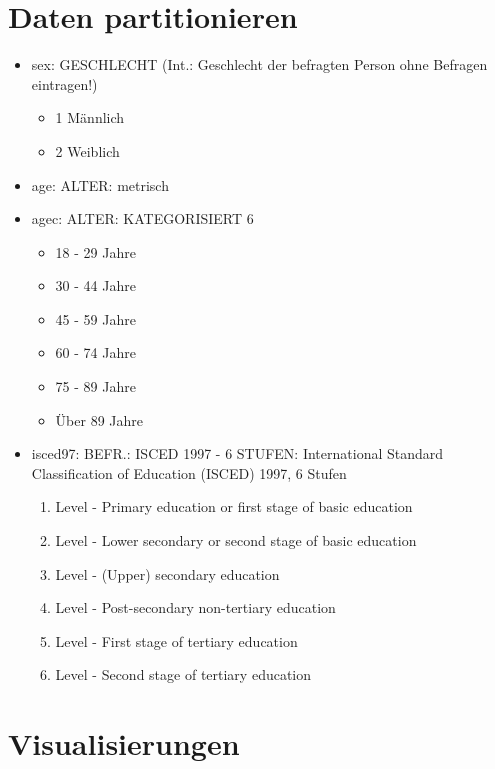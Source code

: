 \documentclass[]{article}
\providecommand{\tightlist}{%
  \setlength{\itemsep}{0pt}\setlength{\parskip}{0pt}}
\begin{document}
\section{Daten partitionieren}\label{daten-partitionieren}

\begin{itemize}
\tightlist
\item
  sex: GESCHLECHT (Int.: Geschlecht der befragten Person ohne Befragen
  eintragen!)

  \begin{itemize}
  \tightlist
  \item
    1 Männlich
  \item
    2 Weiblich
  \end{itemize}
\item
  age: ALTER: metrisch
\item
  agec: ALTER: KATEGORISIERT 6

  \begin{itemize}
  \tightlist
  \item
    18 - 29 Jahre
  \item
    30 - 44 Jahre
  \item
    45 - 59 Jahre
  \item
    60 - 74 Jahre
  \item
    75 - 89 Jahre
  \item
    Über 89 Jahre
  \end{itemize}
\item
  isced97: BEFR.: ISCED 1997 - 6 STUFEN: International Standard
  Classification of Education (ISCED) 1997, 6 Stufen

  \begin{enumerate}
  \def\labelenumi{\arabic{enumi}.}
  \tightlist
  \item
    Level - Primary education or first stage of basic education
  \item
    Level - Lower secondary or second stage of basic education
  \item
    Level - (Upper) secondary education
  \item
    Level - Post-secondary non-tertiary education
  \item
    Level - First stage of tertiary education
  \item
    Level - Second stage of tertiary education
  \end{enumerate}
\end{itemize}

\section{Visualisierungen}\label{visualisierungen}
\end{document}
